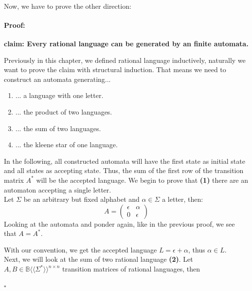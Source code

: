 \documentclass[12pt,letterpaper]{article}
\newenvironment{proof}{\paragraph{Proof:}}{\hfill$\square$}
\newcommand{\fps}[1] {
\mathbb{#1}\langle \langle \Sigma^* \rangle \rangle
}
\begin{document}
\pagebreak
\\
Now, we have to prove the other direction:
\begin{proof}
  \begin{center}
    {\bf claim: Every rational language can be generated 
    by an finite automata.}
  \end{center}
    Previously in this chapter, we defined rational language inductively,  naturally we want to prove the claim with structural induction. That  means we need to construct an automata generating...
  \begin{enumerate}
    \item ... a language with one letter.
    \item ... the product of two languages.
    \item ... the sum of two languages.
    \item ... the kleene star of one language.
  \end{enumerate}
  In the following, all constructed automata will have the first
  state as initial state and all states as accepting state.
  Thus, the sum of the first row of the transition
  matrix $A^*$ will be the accepted language.
  We begin to prove that {\bf (1)} there are an automaton accepting a
  single letter.\\
  Let $\Sigma$ be an arbitrary but fixed alphabet and 
  $\alpha \in \Sigma$ a letter, then:
  \[
    A = 
    \begin{pmatrix}
      \epsilon & \alpha\\
      0        & \epsilon
    \end{pmatrix}
  \]
    Looking at the automata and ponder again, like in the previous proof, we see that $A = A^*$.
  \begin{center}
  \end{center}
  With our convention,
  we get the accepted language $L = \epsilon + \alpha$, thus $\alpha \in L$.\\
  Next, we will look at the sum of two rational language {\bf (2)}. Let $A,B \in \fps{B}^{n \times n}$ transition matrices of rational languages, then

\end{proof}
\end{document}
